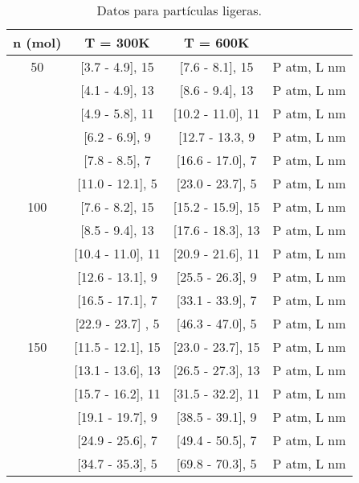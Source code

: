 \documentclass[]{article}
\begin{document}
\begin{table}
 \centering
 \begin{tabular}{|c|c|c|l|} \hline
  n (mol)&  T = 300K        &    T = 600K    &        \\ \hline
   50    & [3.7 - 4.9], 15 & [7.6 - 8.1], 15& P atm, L nm\\ 
         & [4.1 - 4.9], 13 & [8.6 - 9.4], 13& P atm, L nm\\
         & [4.9 - 5.8], 11 & [10.2 - 11.0], 11& P atm, L nm\\ 
         & [6.2 - 6.9],  9 & [12.7 - 13.3,  9& P atm, L nm\\ 
         & [7.8 - 8.5],  7 & [16.6 - 17.0],  7& P atm, L nm\\  
         & [11.0 - 12.1], 5 & [23.0 - 23.7],  5& P atm, L nm\\ \hline
   100   & [7.6 - 8.2], 15 & [15.2 - 15.9], 15& P atm, L nm\\ 
         & [8.5 - 9.4], 13 & [17.6 - 18.3], 13& P atm, L nm\\
         & [10.4 - 11.0], 11 & [20.9 - 21.6], 11& P atm, L nm\\ 
         & [12.6 - 13.1], 9 & [25.5 - 26.3],  9& P atm, L nm\\ 
         & [16.5 - 17.1], 7 & [33.1 - 33.9],  7& P atm, L nm\\  
         & [22.9 - 23.7] , 5 & [46.3 - 47.0],  5& P atm, L nm\\ \hline
   150   & [11.5 - 12.1], 15 & [23.0 - 23.7], 15& P atm, L nm\\ 
         & [13.1 - 13.6], 13 & [26.5 - 27.3], 13& P atm, L nm\\
         & [15.7 - 16.2], 11 & [31.5 - 32.2], 11& P atm, L nm\\ 
         & [19.1 - 19.7],  9 & [38.5 - 39.1],  9& P atm, L nm\\ 
         & [24.9 - 25.6],  7 & [49.4 - 50.5],  7& P atm, L nm\\  
         & [34.7 - 35.3],  5 & [69.8 - 70.3],  5& P atm, L nm\\ \hline

   

 \end{tabular}
 \caption{\label{tab:Pesadas} Datos para partículas ligeras.}
 \end{table}
\end{document}
